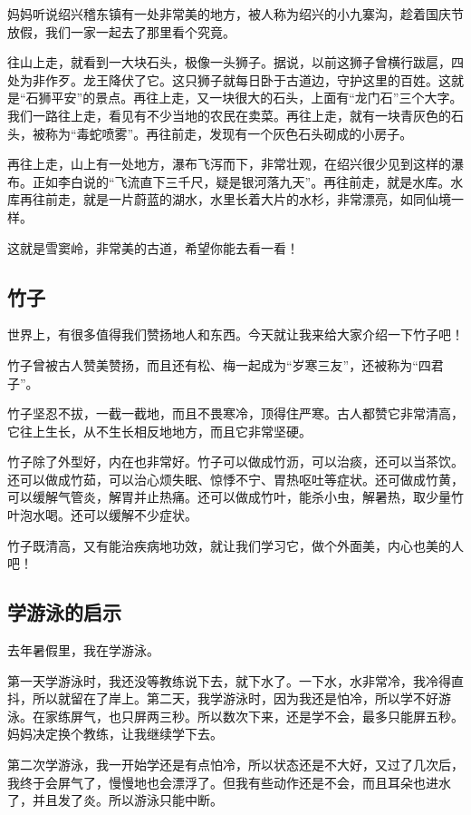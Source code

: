 \documentclass[UTF8,a4paper,titlepage,twoside,10.5pt]{article}
\begin{document}
妈妈听说绍兴稽东镇有一处非常美的地方，被人称为绍兴的小九寨沟，趁着国庆节放假，我们一家一起去了那里看个究竟。

往山上走，就看到一大块石头，极像一头狮子。据说，以前这狮子曾横行跋扈，四处为非作歹。龙王降伏了它。这只狮子就每日卧于古道边，守护这里的百姓。这就是“石狮平安”的景点。再往上走，又一块很大的石头，上面有“龙门石”三个大字。我们一路往上走，看见有不少当地的农民在卖菜。再往上走，就有一块青灰色的石头，被称为“毒蛇喷雾”。再往前走，发现有一个灰色石头砌成的小房子。

再往上走，山上有一处地方，瀑布飞泻而下，非常壮观，在绍兴很少见到这样的瀑布。正如李白说的“飞流直下三千尺，疑是银河落九天”。再往前走，就是水库。水库再往前走，就是一片蔚蓝的湖水，水里长着大片的水杉，非常漂亮，如同仙境一样。

这就是雪窦岭，非常美的古道，希望你能去看一看！

\subsection{竹子}
\label{sec:org07796ca}

世界上，有很多值得我们赞扬地人和东西。今天就让我来给大家介绍一下竹子吧！

竹子曾被古人赞美赞扬，而且还有松、梅一起成为“岁寒三友”，还被称为“四君子”。

竹子坚忍不拔，一截一截地，而且不畏寒冷，顶得住严寒。古人都赞它非常清高，它往上生长，从不生长相反地地方，而且它非常坚硬。

竹子除了外型好，内在也非常好。竹子可以做成竹沥，可以治痰，还可以当茶饮。还可以做成竹茹，可以治心烦失眠、惊悸不宁、胃热呕吐等症状。还可做成竹黄，可以缓解气管炎，解胃并止热痛。还可以做成竹叶，能杀小虫，解暑热，取少量竹叶泡水喝。还可以缓解不少症状。

竹子既清高，又有能治疾病地功效，就让我们学习它，做个外面美，内心也美的人吧！

\subsection{学游泳的启示}
\label{sec:orgd0810df}

去年暑假里，我在学游泳。

第一天学游泳时，我还没等教练说下去，就下水了。一下水，水非常冷，我冷得直抖，所以就留在了岸上。第二天，我学游泳时，因为我还是怕冷，所以学不好游泳。在家练屏气，也只屏两三秒。所以数次下来，还是学不会，最多只能屏五秒。妈妈决定换个教练，让我继续学下去。

第二次学游泳，我一开始学还是有点怕冷，所以状态还是不大好，又过了几次后，我终于会屏气了，慢慢地也会漂浮了。但我有些动作还是不会，而且耳朵也进水了，并且发了炎。所以游泳只能中断。
\end{document}
